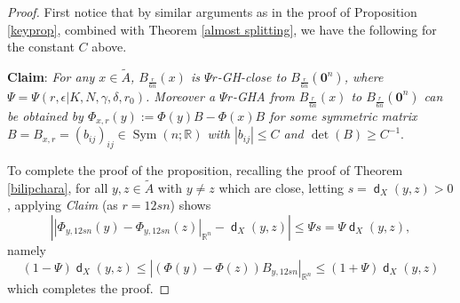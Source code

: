 \documentclass[11pt,reqno]{amsart}
\theoremstyle{definition}
\numberwithin{equation}{section}
\newcommand{\bo}{\bm{0}}
\DeclareMathOperator{\dist}{\mathsf{d}}
\DeclareMathOperator{\Sym}{Sym}
\begin{document}
\begin{proof}
First notice that by similar arguments as in the proof of Proposition \ref{keyprop}, combined with Theorem \ref{almost splitting}, we have the following for the constant $C$ above.

\smallskip

\textbf{Claim}: \textit{For any $x \in \tilde{A}$, $B_{\frac{r}{6n}}(x)$ is $\Psi r$-GH-close to $B_{\frac{r}{6n}}(\bo^n)$, where $\Psi=\Psi(r, \epsilon| K, N, \gamma, \delta, r_0)$. Moreover a $\Psi r$-GHA from $B_{\frac{r}{6n}}(x)$ to $B_{\frac{r}{6n}}(\bo^n)$ can be obtained by 
$
    \Phi_{x, r}(y):=\Phi(y) B-\Phi (x)B
$
for some symmetric matrix $B=B_{x, r}=(b_{ij})_{ij} \in \Sym (n;\mathbb{R})$ with
$
    |b_{ij}| \le C$ and  $\det(B) \ge C^{-1}.
$}

\smallskip



To complete the proof of the proposition, recalling the proof of Theorem \ref{bilipchara}, for all $y, z \in \tilde A$ with $y \neq z$ which are close, letting $s=\dist_X(y,z)>0$, applying \textit{Claim}  (as $r=12sn$)   shows
$$
\left| \left|\Phi_{y, 12sn}(y)-\Phi_{y, 12sn}(z)\right|_{\mathbb{R}^n}-\dist_X(y, z)\right| \le \Psi s=\Psi \dist_X(y, z),
$$
namely
$$
(1-\Psi)\dist_X(y, z) \le |(\Phi(y)-\Phi(z))B_{y, 12sn}|_{\mathbb{R}^n} \le (1+\Psi)\dist_X(y, z)
$$
which completes the proof.
\end{proof}
\end{document}
